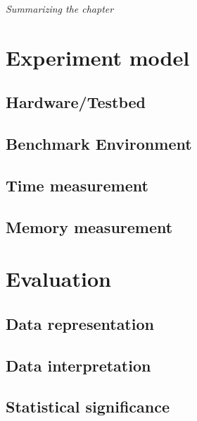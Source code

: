 \textit{Summarizing the chapter}

\section{Experiment model}

\subsection{Hardware/Testbed}
\subsection{Benchmark Environment}
\subsection{Time measurement}
\subsection{Memory measurement}

\section{Evaluation}

\subsection{Data representation}
\subsection{Data interpretation}
\subsection{Statistical significance}

